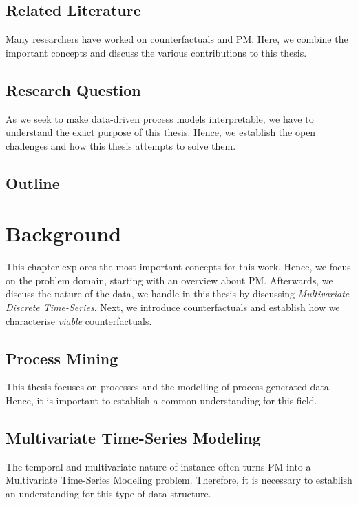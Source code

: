 \documentclass[runningheads]{llncs}
\begin{document}
\subsection{Related Literature}
\label{sec:literature}
Many researchers have worked on counterfactuals and \Gls{PM}. 
Here, we combine the important concepts and discuss the various contributions to this thesis.



\subsection{Research Question}
\label{sec:rq}
As we seek to make data-driven process models interpretable, we have to understand the exact purpose of this thesis. Hence, we establish the open challenges and how this thesis attempts to solve them. 


\subsection{Outline}




\section{Background}
\label{ch:prereq}
This chapter explores the most important concepts for this work. Hence, we focus on the problem domain, starting with an overview about \Gls{PM}. Afterwards, we discuss the nature of the data, we handle in this thesis by discussing \emph{Multivariate Discrete Time-Series}. Next, we introduce counterfactuals and establish how we characterise \emph{viable} counterfactuals. 

\subsection{Process Mining}
\label{sec:process}
This thesis focuses on processes and the modelling of process generated data. Hence, it is important to establish a common understanding for this field.


\subsection{Multivariate Time-Series Modeling}
\label{sec:sequences}
The temporal and multivariate nature of \gls{instance} often turns \Gls{PM} into a Multivariate Time-Series Modeling problem. Therefore, it is necessary to establish an understanding for this type of data structure.

\end{document}
